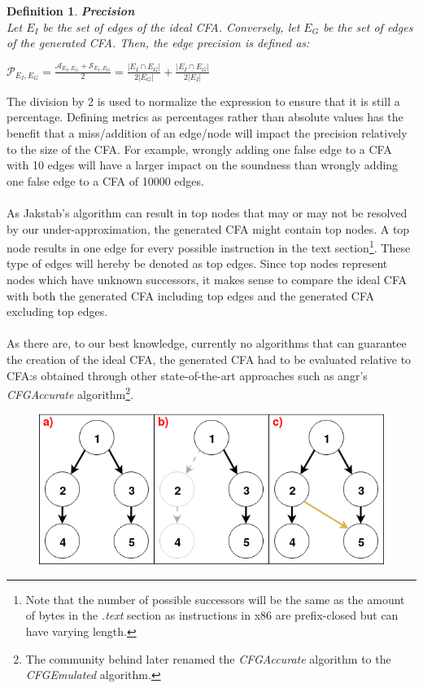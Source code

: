 \documentclass{kththesis}
\newtheorem*{definition}{Definition}
\renewcommand{\it}[1]{\textit{#1}}
\begin{document}
\begin{definition} \textbf{Precision}\\
Let $E_I$ be the set of edges of the ideal CFA. Conversely, let $E_G$ be the set of edges of the generated CFA. Then, the edge precision is defined as:
\begin{center}
$\mathcal{P}_{E_I,E_G} = \frac{\mathcal{A}_{E_I,E_G}+\mathcal{S}_{E_I,E_G}}{2} = \frac{|E_I \cap E_G|}{2|E_G|}+\frac{|E_I \cap E_G|}{2|E_I|}$
\end{center}
\end{definition}
\noindent
The division by 2 is used to normalize the expression to ensure that it is still a percentage. Defining metrics as percentages rather than absolute values has the benefit that a miss/addition of an edge/node will impact the precision relatively to the size of the CFA. For example, wrongly adding one false edge to a CFA with 10 edges will have a larger impact on the soundness than wrongly adding one false edge to a CFA of 10000 edges.
\\ \\
As Jakstab's algorithm can result in top nodes that may or may not be resolved by our under-approximation, the generated CFA might contain top nodes. A top node results in one edge for every possible instruction in the text section\footnote{Note that the number of possible successors will be the same as the amount of bytes in the \it{.text} section as instructions in x86 are prefix-closed but can have varying length.}. These type of edges will hereby be denoted as top edges. Since top nodes represent nodes which have unknown successors, it makes sense to compare the ideal CFA with both the generated CFA including top edges and the generated CFA excluding top edges. 
\\ \\
As there are, to our best knowledge, currently no algorithms that can guarantee the creation of the ideal CFA, the generated CFA had to be evaluated relative to CFA:s obtained through other state-of-the-art approaches such as angr's \textit{CFGAccurate} algorithm\cite{angr}\footnote{The community behind  later renamed the \textit{CFGAccurate} algorithm to the \textit{CFGEmulated} algorithm.}.
\begin{figure}[ht]
    \centering
    \includegraphics[scale=0.6]{Images/SoundAccurateGraph.png}
\end{figure}
\end{document}
